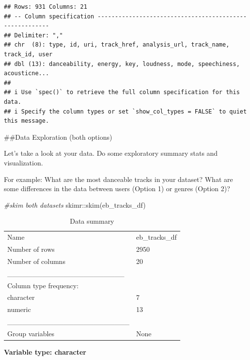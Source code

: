 \documentclass[
]{article}
\newenvironment{Shaded}{\begin{snugshade}}{\end{snugshade}}
\newcommand{\CommentTok}[1]{\textcolor[rgb]{0.56,0.35,0.01}{\textit{#1}}}
\newcommand{\FunctionTok}[1]{\textcolor[rgb]{0.00,0.00,0.00}{#1}}
\newcommand{\NormalTok}[1]{#1}
\newcommand{\SpecialCharTok}[1]{\textcolor[rgb]{0.00,0.00,0.00}{#1}}
\begin{document}
\begin{verbatim}
## Rows: 931 Columns: 21
## -- Column specification --------------------------------------------------------
## Delimiter: ","
## chr  (8): type, id, uri, track_href, analysis_url, track_name, track_id, user
## dbl (13): danceability, energy, key, loudness, mode, speechiness, acousticne...
## 
## i Use `spec()` to retrieve the full column specification for this data.
## i Specify the column types or set `show_col_types = FALSE` to quiet this message.
\end{verbatim}

\#\#Data Exploration (both options)

Let's take a look at your data. Do some exploratory summary stats and
visualization.

For example: What are the most danceable tracks in your dataset? What
are some differences in the data between users (Option 1) or genres
(Option 2)?

\begin{Shaded}
\begin{Highlighting}[]
\CommentTok{\#skim both datasets}
\NormalTok{skimr}\SpecialCharTok{::}\FunctionTok{skim}\NormalTok{(eb\_tracks\_df)}
\end{Highlighting}
\end{Shaded}

\begin{longtable}[]{@{}ll@{}}
\caption{Data summary}\tabularnewline
\toprule()
\endhead
Name & eb\_tracks\_df \\
Number of rows & 2950 \\
Number of columns & 20 \\
\_\_\_\_\_\_\_\_\_\_\_\_\_\_\_\_\_\_\_\_\_\_\_ & \\
Column type frequency: & \\
character & 7 \\
numeric & 13 \\
\_\_\_\_\_\_\_\_\_\_\_\_\_\_\_\_\_\_\_\_\_\_\_\_ & \\
Group variables & None \\
\bottomrule()
\end{longtable}

\textbf{Variable type: character}
\end{document}
